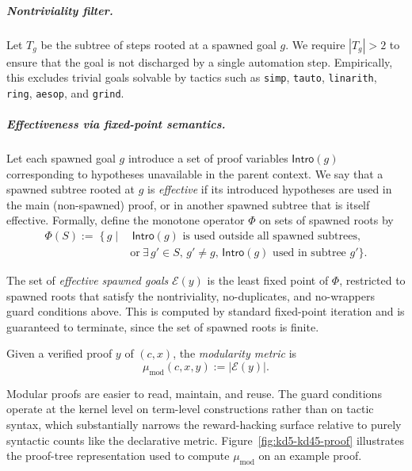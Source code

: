 \subparagraph{Nontriviality filter.} Let $T_g$ be the subtree of steps rooted at a spawned goal $g$. We require $|T_g| > 2$ to ensure that the goal is not discharged by a single automation step. Empirically, this excludes trivial goals solvable by tactics such as \texttt{simp}, \texttt{tauto}, \texttt{linarith}, \texttt{ring}, \texttt{aesop}, and \texttt{grind}.

\subparagraph{Effectiveness via fixed-point semantics.} Let each spawned goal $g$ introduce a set of proof variables $\mathsf{Intro}(g)$ corresponding to hypotheses unavailable in the parent context. We say that a spawned subtree rooted at $g$ is \emph{effective} if its introduced hypotheses are used in the main (non-spawned) proof, or in another spawned subtree that is itself effective. Formally, define the monotone operator $\Phi$ on sets of spawned roots by
\begin{align*}
\Phi(S) :=\; \bigl\{\, g \;\big|\;&\, \mathsf{Intro}(g) \text{ is used outside all spawned subtrees},\\
&\text{or}\ \exists\, g' \in S,\, g' \neq g,\, \mathsf{Intro}(g) \text{ used in subtree } g' \bigr\}.
\end{align*}

\begin{definition}\label{def:effective_spawned}
The set of \emph{effective spawned goals} $\mathcal{E}(y)$ is the least fixed point of $\Phi$, restricted to spawned roots that satisfy the nontriviality, no-duplicates, and no-wrappers guard conditions above. This is computed by standard fixed-point iteration and is guaranteed to terminate, since the set of spawned roots is finite.
\end{definition}

\begin{definition}\label{def:modularity_metric}
Given a verified proof $y$ of $(c,x)$, the \emph{modularity metric} is
\[
\mu_{\mathrm{mod}}(c,x,y) := \bigl|\mathcal{E}(y)\bigr|.
\]
\end{definition}

Modular proofs are easier to read, maintain, and reuse. The guard conditions operate at the kernel level on term-level constructions rather than on tactic syntax, which substantially narrows the reward-hacking surface relative to purely syntactic counts like the declarative metric. Figure~\ref{fig:kd5-kd45-proof} illustrates the proof-tree representation used to compute $\mu_{\mathrm{mod}}$ on an example proof.


